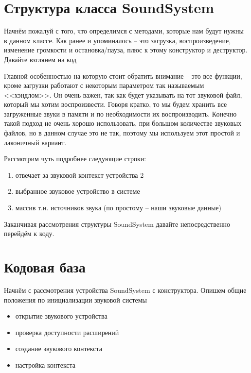 \section{Структура класса SoundSystem}
Начнём пожалуй с того, что определимся с методами, которые нам будут нужны в данном классе. Как ранее и 
упоминалось -- это загрузка, воспроизведение, изменение громкости и остановка/пауза, плюс к этому 
конструктор и деструктор. Давайте взглянем на код


\pagebreak

Главной особенностью на которую стоит обратить внимание -- это все функции, кроме загрузки работают с 
некоторым параметром так называемым <<хэндлом>>. Он очень важен, так как будет указывать на тот звуковой 
файл, который мы хотим воспроизвести. Говоря кратко, то мы будем хранить все загруженные звуки в памяти и по 
необходимости их воспроизводить. Конечно такой подход не очень хорошо использовать, при большом количестве 
звуковых файлов, но в данном случае это не так, поэтому мы используем этот простой и лаконичный вариант.

Рассмотрим чуть подробнее следующие строки:

\begin{enumerate}\itemsep-5pt
    \item отвечает за звуковой контекст устройства 2
    \item выбранное звуковое устройство в системе
    \item массив т.н. источников звука (по простому -- наши звуковые данные)
\end{enumerate}

Заканчивая рассмотрения структуры SoundSystem давайте непосредственно перейдём к коду.

\section{Кодовая база}
Начнём с рассмотрения устройства SoundSystem с конструктора. Опишем общие положения по инициализации 
звуковой системы
\begin{itemize}\itemsep-5pt
    \item открытие звукового устройства
    \item проверка доступности расширений
    \item создание звукового контекста
    \item настройка контекста
\end{itemize}

